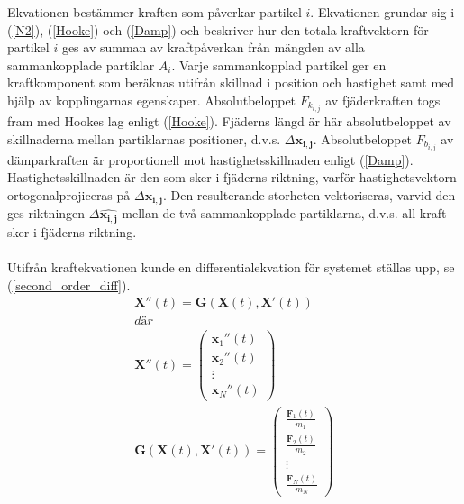 \documentclass[a4paper,12pt,oneside,final,swedish]{extarticle}
\begin{document}
Ekvationen bestämmer kraften som påverkar partikel $i$. Ekvationen grundar sig i (\ref{N2}), (\ref{Hooke}) och (\ref{Damp}) och beskriver hur den totala kraftvektorn för partikel $i$ ges av summan av kraftpåverkan från mängden av alla sammankopplade partiklar $A_i$. Varje sammankopplad partikel ger en kraftkomponent som beräknas utifrån skillnad i position och hastighet samt med hjälp av kopplingarnas egenskaper. Absolutbeloppet $F_{k_{i,j}}$ av fjäderkraften togs fram med Hookes lag enligt (\ref{Hooke}). Fjäderns längd är här absolutbeloppet av skillnaderna mellan partiklarnas positioner, d.v.s. \begin{math} \Delta \mathbf{x_{i,j}}  \end{math}. Absolutbeloppet $F_{b_{i,j}}$ av dämparkraften är proportionell mot hastighetsskillnaden enligt (\ref{Damp}). Hastighetsskillnaden är den som sker i fjäderns riktning, varför hastighetsvektorn ortogonalprojiceras på \begin{math} \Delta \mathbf{x_{i,j}}  \end{math}. Den resulterande storheten vektoriseras, varvid den ges riktningen \begin{math} \Delta \mathbf{\hat{x_{i,j}}}  \end{math} mellan de två sammankopplade partiklarna, d.v.s. all kraft sker i fjäderns riktning.
\\\\Utifrån kraftekvationen kunde en differentialekvation för systemet ställas upp, se (\ref{second_order_diff}).
\begin{equation}
\begin{split}
\mathbf X''(t)=\mathbf G(\mathbf X(t),\mathbf X'(t))\\ där\\ \mathbf X''(t)=\begin{pmatrix} \mathbf{ x }_{ 1 }''(t)
\\ \mathbf{ x }_{ 2 }''(t)
\\ \vdots 
\\ \mathbf{ x }_{ N }''(t) \end{pmatrix}
\\ \mathbf G(\mathbf X(t),\mathbf X'(t))=\begin{pmatrix} \frac { \mathbf{ F }_{ 1 }(t) }{ { m }_{ 1 } } 
\\ \frac { \mathbf{ F }_{ 2 }(t) }{ { m }_{ 2 } }
\\ \vdots 
\\ \frac { \mathbf{ F }_{ N }(t) }{ { m }_{ N } }  \end{pmatrix}
\end{split}
\label{second_order_diff}
\end{equation}
\end{document}
